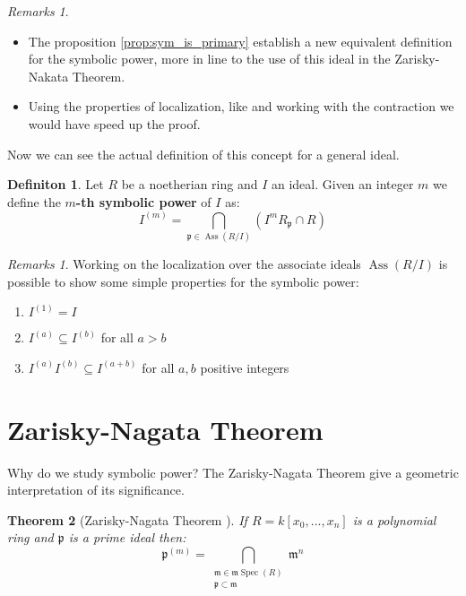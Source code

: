 \documentclass[]{book}
\theoremstyle{plain}
\newtheorem{teo}{Theorem}[section]
\theoremstyle{remark}
\newtheorem{rems}[rem]{Remarks}
\theoremstyle{definition}
\newtheorem{deff}[teo]{Definiton}
\newcommand{\p}{\mathfrak{p}}
\newcommand{\mm}{\mathfrak{m}}
\DeclareMathOperator{\Ass}{Ass}
\DeclareMathOperator{\Spec}{Spec}
\begin{document}
	\begin{rems}
		\begin{itemize}
		\item The proposition \ref{prop:sym_is_primary} establish a new equivalent definition for the symbolic power, more in line to the use of this ideal in the Zarisky-Nakata Theorem.
		\item Using the properties of localization, like \cite[Proposition 4.8]{AMCD} and working with the contraction we would have speed up the proof.
		\end{itemize}
	\end{rems}
	
Now we can see the actual definition of this concept for a general ideal.

\begin{deff}
	Let $ R $ be a noetherian ring and $ I $ an ideal. Given an integer $ m $ we define the \textbf{$ m $-th symbolic power} of $ I $ as:
	\begin{equation}\label{eq:sym_pow_def}
		I^{(m)} = \bigcap_{\p \in \Ass(R/I) } (I^m R_\p \cap R)
	\end{equation}
\end{deff}

\begin{rems} \label{rem:symb_basic}
Working on the localization over the associate ideals $ \Ass(R/I) $ is possible to show some simple properties for the symbolic power:
\begin{enumerate}
\item $ I^{(1)}=I $
\item $ I^{(a)} \subseteq I^{(b)} $ for all $ a > b $
\item $ I^{(a)}I^{(b)}\subseteq I^{(a+b)} $ for all $ a,b $ positive integers
\end{enumerate}
\end{rems}



\section{Zarisky-Nagata Theorem}
Why do we study symbolic power? The Zarisky-Nagata Theorem give a geometric interpretation of its significance.

\begin{teo}[Zarisky-Nagata Theorem \cite{Zar49, Nagata62}] \label{teo:zarnaga}
	If $ R = k[x_0 , ... , x_n] $ is a polynomial ring and $ \p $ is a prime ideal then:
	\begin{equation}\label{eq:zar_nag_teo}
	\p^{(m)} = \bigcap_{\substack{ \mm \in \mm\Spec (R)\\ \p \subset \mm}} \mm ^n
	\end{equation}
\end{teo}
\end{document}
